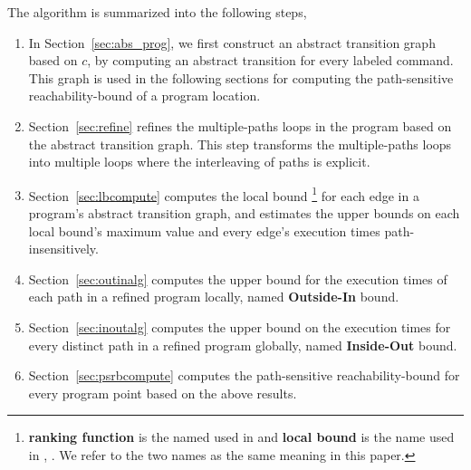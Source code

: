The algorithm is summarized into the following steps,
%
%
\begin{enumerate}
\item  In Section~\ref{sec:abs_prog}, we first construct an abstract transition graph based on $c$, by computing an abstract transition 
for every labeled command. 
This graph is used in the following sections
for computing the path-sensitive reachability-bound of a program location.
\item Section~\ref{sec:refine}
refines the multiple-paths loops in the program
based on the abstract transition graph.
This step transforms the multiple-paths loops into multiple loops where
the interleaving of paths is explicit.
\item Section~\ref{sec:lbcompute} computes the local bound 
\footnote{\textbf{ranking function} is the named used in \cite{SinnZV14}
and \textbf{local bound} is the name used in \cite{ZulegerGSV11}, \cite{sinn2017complexity}.
We refer to the two names as the same meaning in this paper.} for each edge in a program's abstract transition graph,
and estimates the upper bounds on each local bound's maximum value and every edge's execution times path-insensitively.
\item Section~\ref{sec:outinalg} computes
the upper bound for the execution times of each path in a refined program locally, named \textbf{Outside-In} bound.
\item Section~\ref{sec:inoutalg}
computes the upper bound on the execution times for
every distinct path in a refined program globally, named \textbf{Inside-Out} bound.
\item Section~\ref{sec:psrbcompute} computes the path-sensitive reachability-bound for every program point
based on the above results.
\end{enumerate}

